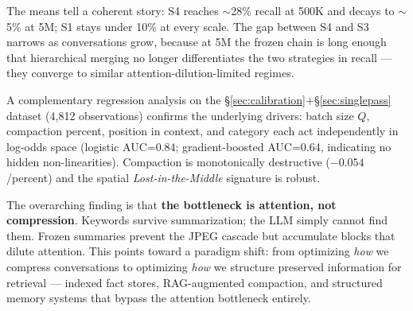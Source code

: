 The means tell a coherent story: S4 reaches $\sim$28\% recall at 500K and decays
to $\sim$5\% at 5M; S1 stays under 10\% at every scale. The gap between S4 and S3
narrows as conversations grow, because at 5M the frozen chain is long enough
that hierarchical merging no longer differentiates the two strategies in
recall --- they converge to similar attention-dilution-limited regimes.

A complementary regression analysis on the \S\ref{sec:calibration}+\S\ref{sec:singlepass} dataset (4{,}812
observations) confirms the underlying drivers: batch size $Q$, compaction
percent, position in context, and category each act independently in
log-odds space (logistic AUC=0.84; gradient-boosted AUC=0.64, indicating
no hidden non-linearities). Compaction is monotonically destructive
($-0.054$/percent) and the spatial \textit{Lost-in-the-Middle} signature is robust.

The overarching finding is that \textbf{the bottleneck is attention, not
compression}. Keywords survive summarization; the LLM simply cannot find
them. Frozen summaries prevent the JPEG cascade but accumulate blocks that
dilute attention. This points toward a paradigm shift: from optimizing \textit{how}
we compress conversations to optimizing \textit{how} we structure preserved
information for retrieval --- indexed fact stores, RAG-augmented compaction,
and structured memory systems that bypass the attention bottleneck entirely.
